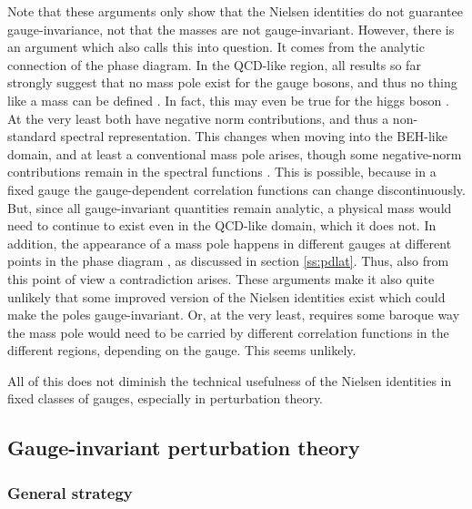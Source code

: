 \documentclass[final,12pt]{article}
\newcommand*{\1}{1\!\!\!\bot}
\begin{document}
Note that these arguments only show that the Nielsen identities do not guarantee gauge-invariance, not that the masses are not gauge-invariant. However, there is an argument which also calls this into question. It comes from the analytic connection of the phase diagram. In the QCD-like region, all results so far strongly suggest that no mass pole exist for the gauge bosons, and thus no thing like a mass can be defined \cite{Maas:2010nc,Capri:2012cr,Maas:2013aia}. In fact, this may even be true for the higgs boson \cite{Maas:2016edk}. At the very least both have negative norm contributions, and thus a non-standard spectral representation. This changes when moving into the BEH-like domain, and at least a conventional mass pole arises, though some negative-norm contributions remain in the spectral functions \cite{Maas:2010nc,Maas:2013aia,Raubitzek:unpublished}. This is possible, because in a fixed gauge the gauge-dependent correlation functions can change discontinuously. But, since all gauge-invariant quantities remain analytic, a physical mass would need to continue to exist even in the QCD-like domain, which it does not. In addition, the appearance of a mass pole happens in different gauges at different points in the phase diagram \cite{Caudy:2007sf}, as discussed in section \ref{ss:pdlat}. Thus, also from this point of view a contradiction arises. These arguments make it also quite unlikely that some improved version of the Nielsen identities exist which could make the poles gauge-invariant. Or, at the very least, requires some baroque way the mass pole would need to be carried by different correlation functions in the different regions, depending on the gauge. This seems unlikely.

All of this does not diminish the technical usefulness of the Nielsen identities in fixed classes of gauges, especially in perturbation theory.

\subsection{Gauge-invariant perturbation theory}\label{ss:gipt}

\subsubsection{General strategy}\label{ss:rules}
\end{document}
